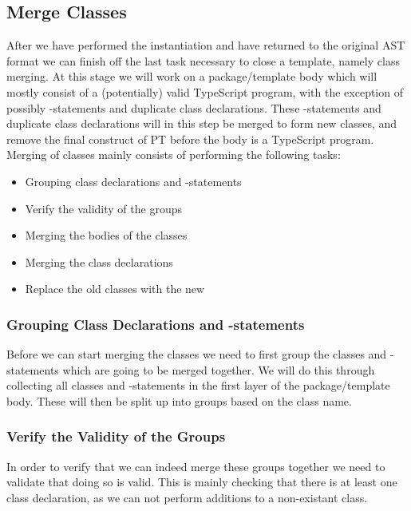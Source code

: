 \subsection{Merge Classes}\label{subsec:merging-class-declarations}

After we have performed the instantiation and have returned to the original AST format we can finish off the last task necessary to close a template, namely class merging.
At this stage we will work on a package/template body which will mostly consist of a (potentially) valid TypeScript program, with the exception of possibly -statements and duplicate class declarations.
These -statements and duplicate class declarations will in this step be merged to form new classes, and remove the final construct of PT before the body is a TypeScript program.
Merging of classes mainly consists of performing the following tasks:

\begin{itemize}
    \item Grouping class declarations and -statements
    \item Verify the validity of the groups
    \item Merging the bodies of the classes
    \item Merging the class declarations
    \item Replace the old classes with the new
\end{itemize}

\subsubsection{Grouping Class Declarations and -statements}

Before we can start merging the classes we need to first group the classes and -statements which are going to be merged together.
We will do this through collecting all classes and -statements in the first layer of the package/template body.
These will then be split up into groups based on the class name.

\subsubsection{Verify the Validity of the Groups}

In order to verify that we can indeed merge these groups together we need to validate that doing so is valid.
This is mainly checking that there is at least one class declaration, as we can not perform additions to a non-existant class.

